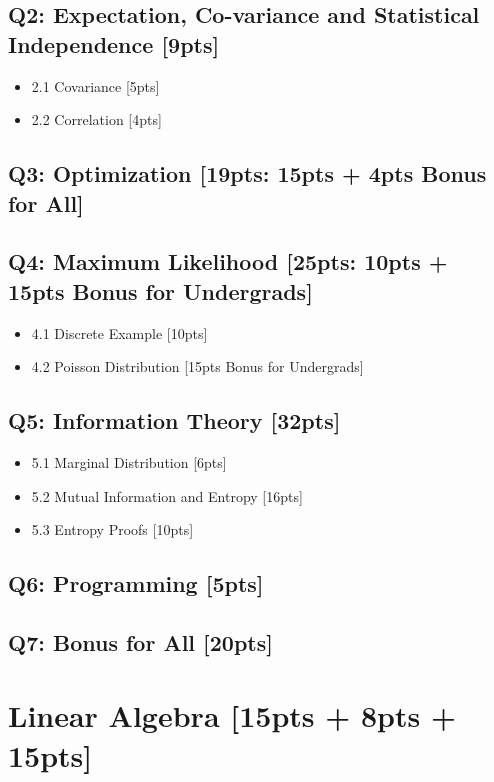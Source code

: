 \documentclass{article}
\begin{document}
\subsection*{Q2: Expectation, Co-variance and Statistical Independence [9pts]}
\begin{itemize}
    \item 2.1 Covariance [5pts]
    \item 2.2 Correlation [4pts]
\end{itemize}
\subsection*{Q3: Optimization [19pts: 15pts + 4pts Bonus for All]}
\subsection*{Q4: Maximum Likelihood [25pts: 10pts + 15pts Bonus for Undergrads]}
\begin{itemize}
    \item 4.1 Discrete Example [10pts]
    \item 4.2 Poisson Distribution [15pts Bonus for Undergrads]
\end{itemize}
\subsection*{Q5: Information Theory [32pts]}
\begin{itemize}
    \item 5.1 Marginal Distribution [6pts]
    \item 5.2 Mutual Information and Entropy [16pts]
    \item 5.3 Entropy Proofs [10pts]
\end{itemize}
\subsection*{Q6: Programming [5pts]}
\subsection*{Q7: Bonus for All [20pts]}

\newpage

\section{Linear Algebra [15pts + 8pts + 15pts]}
\end{document}
